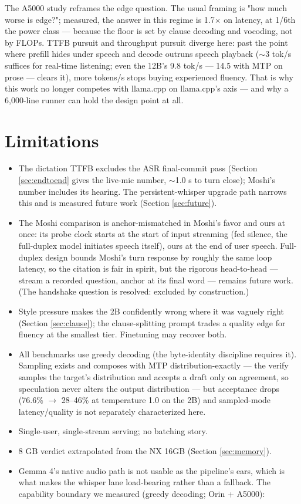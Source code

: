 \documentclass{article}
\begin{document}
The A5000 study reframes the edge question. The usual framing is "how much worse is edge?"; measured, the answer in this regime is 1.7× on latency, at 1/6th the power class --- because the floor is set by clause decoding and vocoding, not by FLOPs. TTFB pursuit and throughput pursuit diverge here: past the point where prefill hides under speech and decode outruns speech playback ($\sim$3 tok/s suffices for real-time listening; even the 12B's 9.8 tok/s --- 14.5 with MTP on prose --- clears it), more tokens/s stops buying experienced fluency. That is why this work no longer competes with llama.cpp on llama.cpp's axis --- and why a 6,000-line runner can hold the design point at all.

\section{Limitations}
\label{sec:limitations}

\begin{itemize}
	\item The dictation TTFB excludes the ASR final-commit pass (Section \ref{sec:endtoend} gives the live-mic number, $\sim$1.0 s to turn close); Moshi's number includes its hearing. The persistent-whisper upgrade path narrows this and is measured future work (Section \ref{sec:future}).
	\item The Moshi comparison is anchor-mismatched in Moshi's favor and ours at once: its probe clock starts at the start of input streaming (fed silence, the full-duplex model initiates speech itself), ours at the end of user speech. Full-duplex design bounds Moshi's turn response by roughly the same loop latency, so the citation is fair in spirit, but the rigorous head-to-head --- stream a recorded question, anchor at its final word --- remains future work. (The handshake question is resolved: excluded by construction.)
	\item Style pressure makes the 2B confidently wrong where it was vaguely right (Section \ref{sec:clause}); the clause-splitting prompt trades a quality edge for fluency at the smallest tier. Finetuning may recover both.
	\item All benchmarks use greedy decoding (the byte-identity discipline requires it). Sampling exists and composes with MTP distribution-exactly --- the verify samples the target's distribution and accepts a draft only on agreement, so speculation never alters the output distribution --- but acceptance drops (76.6\% $\rightarrow$ 28--46\% at temperature 1.0 on the 2B) and sampled-mode latency/quality is not separately characterized here.
	\item Single-user, single-stream serving; no batching story.
	\item 8 GB verdict extrapolated from the NX 16GB (Section \ref{sec:memory}).
	\item Gemma 4's native audio path is not usable as the pipeline's ears, which is what makes the whisper lane load-bearing rather than a fallback. The capability boundary we measured (greedy decoding; Orin + A5000):
\end{itemize}
\end{document}

